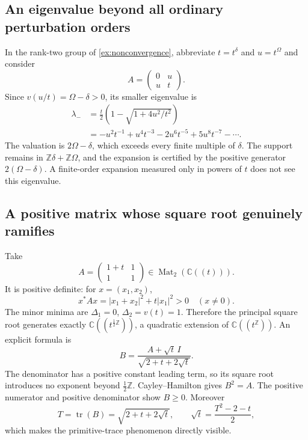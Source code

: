 \documentclass[11pt,letterpaper]{article}
\numberwithin{equation}{section}
\theoremstyle{definition}
\theoremstyle{remark}
\newcommand{\C}{\mathbb C}
\newcommand{\Z}{\mathbb Z}
\newcommand{\Mat}{\operatorname{Mat}}
\newcommand{\tr}{\operatorname{tr}}
\begin{document}
\subsection{An eigenvalue beyond all ordinary perturbation orders}

In the rank-two group of \cref{ex:nonconvergence}, abbreviate
$t=t^\delta$ and $u=t^\Omega$ and consider
\[
 A=\begin{pmatrix}0&u\\u&t\end{pmatrix}.
\]
Since $v(u/t)=\Omega-\delta>0$, its smaller eigenvalue is
\begin{align*}
 \lambda_-&=\frac t2\left(1-\sqrt{1+4u^2/t^2}\right)\\
 &=-u^2t^{-1}+u^4t^{-3}-2u^6t^{-5}+5u^8t^{-7}-\cdots.
\end{align*}
The valuation is $2\Omega-\delta$, which exceeds every finite multiple of
$\delta$. The support remains in $\Z\delta+\Z\Omega$, and the expansion is
certified by the positive generator $2(\Omega-\delta)$. A finite-order
expansion measured only in powers of $t$ does not see this eigenvalue.

\subsection{A positive matrix whose square root genuinely ramifies}

Take
\begin{equation}\label{eq:positive2}
 A=\begin{pmatrix}1+t&1\\1&1\end{pmatrix}\in\Mat_2(\C((t))).
\end{equation}
It is positive definite: for $x=(x_1,x_2)$,
\[
 x^*Ax=|x_1+x_2|^2+t|x_1|^2>0\quad(x\ne0).
\]
The minor minima are $\Delta_1=0$, $\Delta_2=v(t)=1$. Therefore the
principal square root generates exactly $\C((t^{\frac12\Z}))$, a quadratic
extension of $\C((t^\Z))$. An explicit formula is
\begin{equation}\label{eq:positive2root}
 B=\frac{A+\sqrt t\,I}{\sqrt{2+t+2\sqrt t}}.
\end{equation}
The denominator has a positive constant leading term, so its square root
introduces no exponent beyond $\tfrac12\Z$. Cayley--Hamilton gives
$B^2=A$. The positive numerator and positive denominator show $B\ge0$.
Moreover
\[
 T=\tr(B)=\sqrt{2+t+2\sqrt t},\qquad
 \sqrt t=\frac{T^2-2-t}{2},
\]
which makes the primitive-trace phenomenon directly visible.
\end{document}
